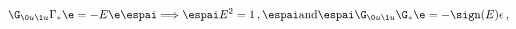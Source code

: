 \begin{equation} \label{F1}
\G_{\0u \1u }\Gamma _*\e=-E \e \espai \Longrightarrow \espai E^2=1\,,
\espai \textrm{and} \espai \G_{\0u \1u}\G_{*}\e=-\sign(E) \epsilon\,,
\end{equation}

